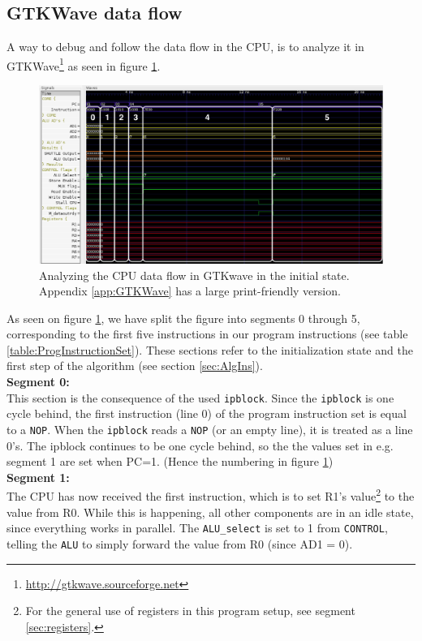 \subsection{GTKWave data flow}
\label{sec:GTKWaveDataflow}

A way to debug and follow the data flow in the CPU, is to analyze it in GTKWave\footnote{\url{http://gtkwave.sourceforge.net}} as seen in figure \ref{fig:GTKWave}. 

\begin{figure}[H]
    \centering
    \includegraphics[width=\textwidth]{3Results/fig/GTKWave.png}
    \caption{Analyzing the CPU data flow in GTKwave in the initial state. Appendix \ref{app:GTKWave} has a large print-friendly version.}
    \label{fig:GTKWave}
\end{figure}

As seen on figure \ref{fig:GTKWave}, we have split the figure into segments 0 through 5, corresponding to the first five instructions in our program instructions (see table \ref{table:ProgInstructionSet}). These sections refer to the initialization state and the first step of the algorithm (see section \ref{sec:AlgIns}).\\

\textbf{Segment 0:} \\
This section is the consequence of the used \texttt{ipblock}. Since the \texttt{ipblock} is one cycle behind, the first instruction (line 0) of the program instruction set is equal to a \texttt{NOP}. When the \texttt{ipblock} reads a \texttt{NOP} (or an empty line), it is treated as a line 0's.
The ipblock continues to be one cycle behind, so the the values set in e.g. segment 1 are set when PC=1. (Hence the numbering in figure \ref{fig:GTKWave})\\

\textbf{Segment 1:} \\
The CPU has now received the first instruction, which is to set R1's value\footnote{For the general use of registers in this program setup, see segment \ref{sec:registers}.}  to the value from R0. While this is happening, all other components are in an idle state, since everything works in parallel. The \texttt{ALU\_select} is set to 1 from \texttt{CONTROL}, telling the \texttt{ALU} to simply forward the value from R0 (since AD1 = 0). \\

